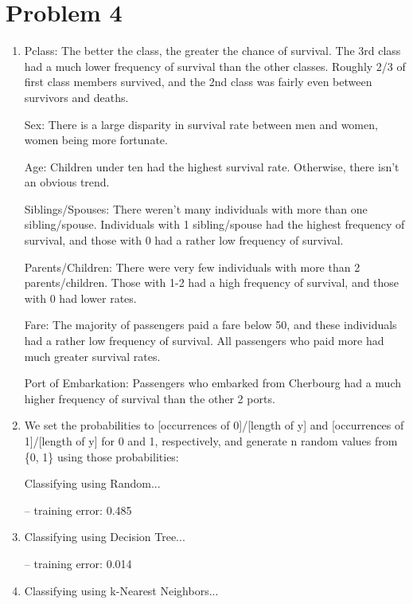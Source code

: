 \documentclass[11pt]{article}
\newcommand{\solution}[1]{{{\color{blue}{\bf Solution:} {#1}}}}
\begin{document}
\section{Problem 4}
\begin{enumerate}
\item %
\solution{

Pclass:
The better the class, the greater the chance of survival. The 3rd class had a much lower frequency of survival than the other classes. Roughly 2/3 of first class members survived, and the 2nd class was fairly even between survivors and deaths.

Sex:
There is a large disparity in survival rate between men and women, women being more fortunate.

Age:
Children under ten had the highest survival rate. Otherwise, there isn’t an obvious trend.

Siblings/Spouses:
There weren’t many individuals with more than one sibling/spouse. Individuals with 1 sibling/spouse had the highest frequency of survival, and those with 0 had a rather low frequency of survival.

Parents/Children:
There were very few individuals with more than 2 parents/children. Those with 1-2 had a high frequency of survival, and those with 0 had lower rates.

Fare:
The majority of passengers paid a fare below 50, and these individuals had a rather low frequency of survival. All passengers who paid more had much greater survival rates.

Port of Embarkation:
Passengers who embarked from Cherbourg had a much higher frequency of survival than the other 2 ports.
}

\item %
\solution{
We set the probabilities to [occurrences of 0]/[length of y] and [occurrences of 1]/[length of y] for 0 and 1, respectively, and generate n random values from \{0, 1\} using those probabilities:

Classifying using Random...

	-- training error: 0.485
}

\item %
\solution{

Classifying using Decision Tree...

	-- training error: 0.014
}

\item %
\solution{

Classifying using k-Nearest Neighbors...

}
\end{enumerate}
\end{document}
